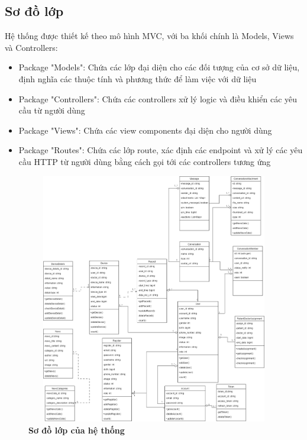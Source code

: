 \subsection{Sơ đồ lớp}
  Hệ thống được thiết kế theo mô hình MVC, với ba khối chính là Models, Views và Controllers:
  \begin{itemize}
    \item Package "Models": Chứa các lớp đại diện cho các đối tượng của cơ sở dữ liệu, định nghĩa các thuộc tính và phương thức để làm việc với dữ liệu
    \item Package "Controllers": Chứa các controllers xử lý logic và điều khiển các yêu cầu từ người dùng
    \item Package "Views": Chứa các view components đại diện cho người dùng
    \item Package "Routes": Chứa các lớp route, xác định các endpoint và xử lý các yêu cầu HTTP từ người dùng bằng cách gọi tới các controllers tương ứng
  \end{itemize}
  \begin{figure}[H]
    \centering
    \includegraphics*[width = 16cm, height = 11cm ]{Images/UML/UML.drawio.png}
    \caption[Sơ đồ lớp của hệ thống]{\bfseries \fontsize{12pt}{0pt}
    \selectfont Sơ đồ lớp của hệ thống}
    \label{UML}
  \end{figure}

